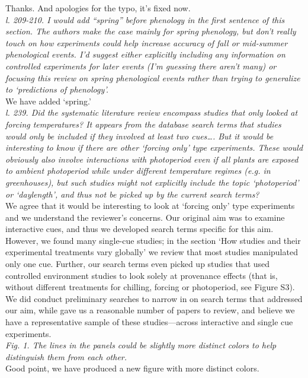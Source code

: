\documentclass[11pt,letter]{article}
\begin{document}
Thanks. And apologies for the typo, it's fixed now.\\

\emph{l. 209-210. I would add “spring” before phenology in the first sentence of this section. The authors make the case mainly for spring phenology, but don't really touch on how experiments could help increase accuracy of fall or mid-summer phenological events. I'd suggest either explicitly including any information on controlled experiments for later events (I'm guessing there aren't many) or focusing this review on spring phenological events rather than trying to generalize to ‘predictions of phenology'.  }\\

We have added `spring.'\\

\emph{l. 239. Did the systematic literature review encompass studies that only looked at forcing temperatures? It appears from the database search terms that studies would only be included if they involved at least two cues…. But it would be interesting to know if there are other `forcing only' type experiments. These would obviously also involve interactions with photoperiod even if all plants are exposed to ambient photoperiod while under different temperature regimes (e.g. in greenhouses), but such studies might not explicitly include the topic `photoperiod' or `daylength', and thus not be picked up by the current search terms? }\\

We agree that it would be interesting to look at `forcing only' type experiments and we understand the reviewer's concerns. Our original aim was to examine interactive cues, and thus we developed search terms specific for this aim. However, we found many single-cue studies; in the section `How studies and their experimental treatments vary globally' we review that most studies manipulated only one cue. Further, our search terms even picked up studies that used controlled environment studies to look solely at provenance effects (that is, without different treatments for chilling, forcing or photoperiod, see Figure S3). We did conduct preliminary searches to narrow in on search terms that addressed our aim, while gave us a reasonable number of papers to review, and believe we have a representative sample of these studies---across interactive and single cue experiments. \\

\emph{Fig. 1. The lines in the panels could be slightly more distinct colors to help distinguish them from each other.}\\

Good point, we have produced a new figure with more distinct colors.


\end{document}
